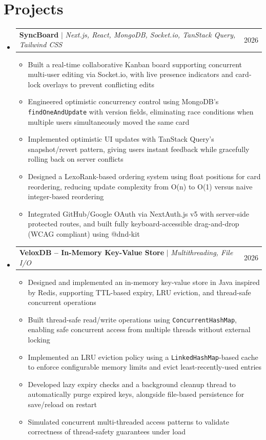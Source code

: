 \documentclass[letterpaper,11pt]{article}
\makeatletter
\newcommand{\resumeItem}[1]{
  \item\small{
    {#1 \vspace{1pt}}
  }
}
\newcommand{\resumeProjectHeading}[2]{
    \item
    \begin{tabular*}{0.97\textwidth}{l@{\extracolsep{\fill}}r}
      \small#1 & #2 \\
    \end{tabular*}\vspace{1pt}
}
\newcommand{\resumeSubHeadingListStart}{\begin{itemize}[leftmargin=0.15in, label={}]}
\newcommand{\resumeSubHeadingListEnd}{\end{itemize}}
\newcommand{\resumeItemListStart}{\begin{itemize}[leftmargin=0.15in, itemsep=1pt]}
\newcommand{\resumeItemListEnd}{\end{itemize}\vspace{4pt}}
\makeatother
\begin{document}
\section{Projects}
    \resumeSubHeadingListStart
      \resumeProjectHeading
          {\textbf{SyncBoard} $|$ \emph{Next.js, React, MongoDB, Socket.io, TanStack Query, Tailwind CSS}}{2026}
          \resumeItemListStart
            \resumeItem{Built a real-time collaborative Kanban board supporting concurrent multi-user editing via Socket.io, with live presence indicators and card-lock overlays to prevent conflicting edits}
            \resumeItem{Engineered optimistic concurrency control using MongoDB's \texttt{findOneAndUpdate} with version fields, eliminating race conditions when multiple users simultaneously moved the same card}
            \resumeItem{Implemented optimistic UI updates with TanStack Query's snapshot/revert pattern, giving users instant feedback while gracefully rolling back on server conflicts}
            \resumeItem{Designed a LexoRank-based ordering system using float positions for card reordering, reducing update complexity from O(n) to O(1) versus naive integer-based reordering}
            \resumeItem{Integrated GitHub/Google OAuth via NextAuth.js v5 with server-side protected routes, and built fully keyboard-accessible drag-and-drop (WCAG compliant) using @dnd-kit}
          \resumeItemListEnd
      \resumeProjectHeading
          {\textbf{VeloxDB -- In-Memory Key-Value Store} $|$ \emph{Multithreading, File I/O}}{2026}
          \resumeItemListStart
            \resumeItem{Designed and implemented an in-memory key-value store in Java inspired by Redis, supporting TTL-based expiry, LRU eviction, and thread-safe concurrent operations}
            \resumeItem{Built thread-safe read/write operations using \texttt{ConcurrentHashMap}, enabling safe concurrent access from multiple threads without external locking}
            \resumeItem{Implemented an LRU eviction policy using a \texttt{LinkedHashMap}-based cache to enforce configurable memory limits and evict least-recently-used entries}
            \resumeItem{Developed lazy expiry checks and a background cleanup thread to automatically purge expired keys, alongside file-based persistence for save/reload on restart}
            \resumeItem{Simulated concurrent multi-threaded access patterns to validate correctness of thread-safety guarantees under load}
          \resumeItemListEnd
    \resumeSubHeadingListEnd

\end{document}
